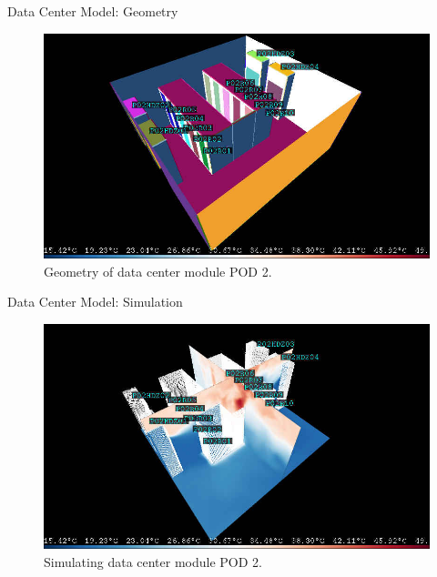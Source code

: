 \documentclass{beamer}
\begin{document}
\begin{frame}{Data Center Model: Geometry}
\begin{figure}[ht]
\begin{center}
\includegraphics[width=\linewidth]{rafsine_pod2_voxel.jpg}
\end{center}
\caption{Geometry of data center module POD 2.}
\end{figure}
\end{frame}

\begin{frame}{Data Center Model: Simulation}
\begin{figure}[ht]
\begin{center}
\includegraphics[width=\linewidth]{rafsine_pod2.jpg}
\end{center}
\caption{Simulating data center module POD 2.}
\end{figure}
\end{frame}
\end{document}
